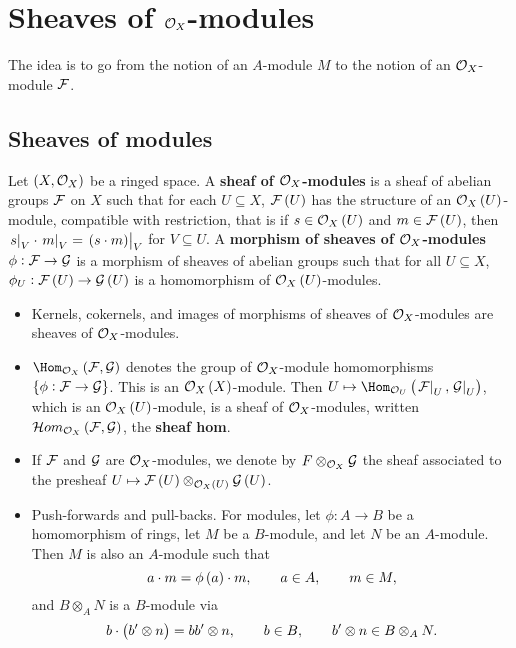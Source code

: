 \section{Sheaves of \texorpdfstring{$ \mathcal{O}_X $-modules}{modules}}

The idea is to go from the notion of an $ A $-module $ M $ to the notion of an $ \mathcal{O}_X $-module $ \mathcal{F} $.

\subsection{Sheaves of modules}

\begin{definition*}
Let $ \br{X, \OOO_X} $ be a ringed space. A \textbf{sheaf of $ \mathcal{O}_X $-modules} is a sheaf of abelian groups $ \mathcal{F} $ on $ X $ such that for each $ U \subseteq X $, $ \FFF\br{U} $ has the structure of an $ \OOO_X\br{U} $-module, compatible with restriction, that is if $ s \in \OOO_X\br{U} $ and $ m \in \FFF\br{U} $, then $ \eval{s}_V \cdot \eval{m}_V = \eval{\br{s \cdot m}}_V $ for $ V \subseteq U $. A \textbf{morphism of sheaves of $ \mathcal{O}_X $-modules} $ \phi : \mathcal{F} \to \mathcal{G} $ is a morphism of sheaves of abelian groups such that for all $ U \subseteq X $, $ \phi_U : \FFF\br{U} \to \GGG\br{U} $ is a homomorphism of $ \OOO_X\br{U} $-modules.
\begin{itemize}
\item Kernels, cokernels, and images of morphisms of sheaves of $ \mathcal{O}_X $-modules are sheaves of $ \mathcal{O}_X $-modules.
\item $ \Hom_{\OOO_X}\br{\FFF, \GGG} $ denotes the group of $ \mathcal{O}_X $-module homomorphisms $ \cbr{\phi : \FFF \to \GGG} $. This is an $ \OOO_X\br{X} $-module. Then $ U \mapsto \Hom_{\OOO_U}\br{\eval{\FFF}_U, \eval{\GGG}_U} $, which is an $ \OOO_X\br{U} $-module, is a sheaf of $ \mathcal{O}_X $-modules, written $ \HOM_{\OOO_X}\br{\FFF, \GGG} $, the \textbf{sheaf hom}.
\item If $ \mathcal{F} $ and $ \mathcal{G} $ are $ \mathcal{O}_X $-modules, we denote by $ F \otimes_{\mathcal{O}_X} \mathcal{G} $ the sheaf associated to the presheaf $ U \mapsto \FFF\br{U} \otimes_{\OOO_X\br{U}} \GGG\br{U} $.
\item Push-forwards and pull-backs. For modules, let $ \phi : A \to B $ be a homomorphism of rings, let $ M $ be a $ B $-module, and let $ N $ be an $ A $-module. Then $ M $ is also an $ A $-module such that
$$ a \cdot m = \phi\br{a} \cdot m, \qquad a \in A, \qquad m \in M, $$
and $ B \otimes_A N $ is a $ B $-module via
$$ b \cdot \br{b' \otimes n} = bb' \otimes n, \qquad b \in B, \qquad b' \otimes n \in B \otimes_A N. $$

\end{itemize}
\end{definition*}
